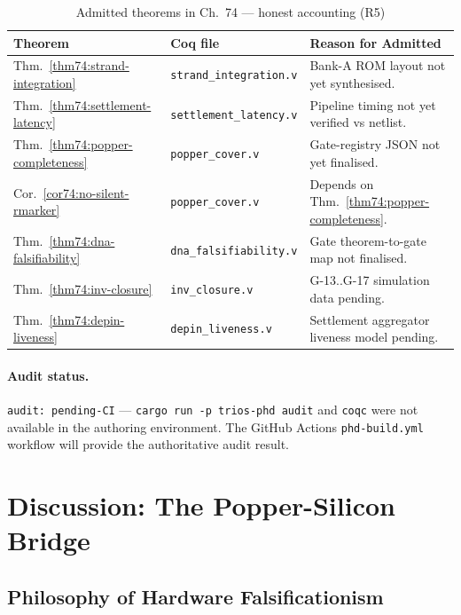 \begin{table}[H]
\centering
\caption{Admitted theorems in Ch.~74 — honest accounting (R5)}
\label{tab74:admitted}
\small
\begin{tabular}{llp{6.5cm}}
\toprule
Theorem & Coq file & Reason for Admitted \\
\midrule
Thm.~\ref{thm74:strand-integration} & \texttt{strand\_integration.v} & Bank-A ROM layout not yet synthesised. \\
Thm.~\ref{thm74:settlement-latency} & \texttt{settlement\_latency.v} & Pipeline timing not yet verified vs netlist. \\
Thm.~\ref{thm74:popper-completeness} & \texttt{popper\_cover.v} & Gate-registry JSON not yet finalised. \\
Cor.~\ref{cor74:no-silent-rmarker}  & \texttt{popper\_cover.v} & Depends on Thm.~\ref{thm74:popper-completeness}. \\
Thm.~\ref{thm74:dna-falsifiability} & \texttt{dna\_falsifiability.v} & Gate theorem-to-gate map not finalised. \\
Thm.~\ref{thm74:inv-closure}        & \texttt{inv\_closure.v} & G-13..G-17 simulation data pending. \\
Thm.~\ref{thm74:depin-liveness}     & \texttt{depin\_liveness.v} & Settlement aggregator liveness model pending. \\
\bottomrule
\end{tabular}
\end{table}

\paragraph{Audit status.}
\texttt{audit: pending-CI} — \texttt{cargo run -p trios-phd audit} and
\texttt{coqc} were not available in the authoring environment.  The GitHub
Actions \texttt{phd-build.yml} workflow will provide the authoritative
audit result.

\section{Discussion: The Popper-Silicon Bridge}
\label{sec74:discussion}

\subsection{Philosophy of Hardware Falsificationism}
\label{sec74:hw-falsificationism}

